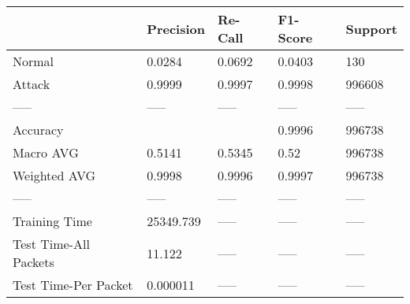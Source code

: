 \begin{tabular}{lllll}
\toprule
{} &  Precision & Re-Call & F1-Score & Support \\
\midrule
Normal                &     0.0284 &  0.0692 &   0.0403 &     130 \\
Attack                &     0.9999 &  0.9997 &   0.9998 &  996608 \\
-----                 &      ----- &   ----- &    ----- &   ----- \\
Accuracy              &            &         &   0.9996 &  996738 \\
Macro AVG             &     0.5141 &  0.5345 &     0.52 &  996738 \\
Weighted AVG          &     0.9998 &  0.9996 &   0.9997 &  996738 \\
-----                 &      ----- &   ----- &    ----- &   ----- \\
Training Time         &  25349.739 &   ----- &    ----- &   ----- \\
Test Time-All Packets &     11.122 &   ----- &    ----- &   ----- \\
Test Time-Per Packet  &   0.000011 &   ----- &    ----- &   ----- \\
\bottomrule
\end{tabular}
